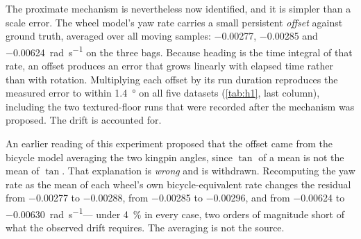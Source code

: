 \begin{table}[htbp]
\centering
\caption{Wheel-odometry heading drift against the fitted yaw-rate scale.
``Rotation'' is the total unsigned ground-truth rotation of the run, and
``error/rotation'' expresses the final heading error as a fraction of it. Scale
error and heading error correspond in neither sign nor magnitude. The last column
is the constant-offset prediction described below: the mean yaw-rate residual of
the run multiplied by its duration, which matches the measured error to within
\SI{1.4}{\degree} on every dataset, and to within \SI{0.5}{\degree} on three of
five.}
\label{tab:h1}
\small
{}
\end{table}

The proximate mechanism is nevertheless now identified, and it is simpler than a
scale error. The wheel model's yaw rate carries a small persistent \emph{offset}
against ground truth, averaged over all moving samples: \SI{-0.00277}{},
\SI{-0.00285}{} and \SI{-0.00624}{\radian\per\second} on the three bags. Because
heading is the time integral of that rate, an offset produces an error that grows
linearly with elapsed time rather than with rotation. Multiplying each offset by
its run duration reproduces the measured error to within \SI{1.4}{\degree} on all
five datasets (\cref{tab:h1}, last column), including the two textured-floor runs
that were recorded after the mechanism was proposed. The drift is accounted for.

\begin{queried}[Corrected]
An earlier reading of this experiment proposed that the offset came from the
bicycle model averaging the two kingpin angles, since $\tan$ of a mean is not the
mean of $\tan$. That explanation is \emph{wrong} and is withdrawn. Recomputing the
yaw rate as the mean of each wheel's own bicycle-equivalent rate changes the
residual from \SI{-0.00277}{} to \SI{-0.00288}{}, from \SI{-0.00285}{} to
\SI{-0.00296}{}, and from \SI{-0.00624}{} to \SI{-0.00630}{\radian\per\second}---
under \SI{4}{\percent} in every case, two orders of magnitude short of what the
observed drift requires. The averaging is not the source.
\end{queried}

